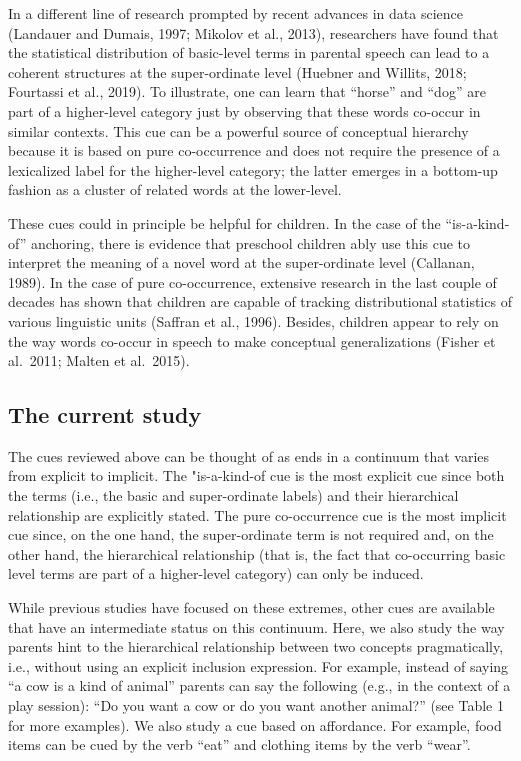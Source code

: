 \documentclass[10pt, letterpaper]{article}
\begin{document}
In a different line of research prompted by recent advances in data
science (Landauer and Dumais, 1997; Mikolov et al., 2013), researchers
have found that the statistical distribution of basic-level terms in
parental speech can lead to a coherent structures at the super-ordinate
level (Huebner and Willits, 2018; Fourtassi et al., 2019). To
illustrate, one can learn that ``horse'' and ``dog'' are part of a
higher-level category just by observing that these words co-occur in
similar contexts. This cue can be a powerful source of conceptual
hierarchy because it is based on pure co-occurrence and does not require
the presence of a lexicalized label for the higher-level category; the
latter emerges in a bottom-up fashion as a cluster of related words at
the lower-level.

These cues could in principle be helpful for children. In the case of
the ``is-a-kind-of'' anchoring, there is evidence that preschool
children ably use this cue to interpret the meaning of a novel word at
the super-ordinate level (Callanan, 1989). In the case of pure
co-occurrence, extensive research in the last couple of decades has
shown that children are capable of tracking distributional statistics of
various linguistic units (Saffran et al., 1996). Besides, children
appear to rely on the way words co-occur in speech to make conceptual
generalizations (Fisher et al.~2011; Malten et al.~2015).

\hypertarget{the-current-study}{%
\subsection{The current study}\label{the-current-study}}

The cues reviewed above can be thought of as ends in a continuum that
varies from explicit to implicit. The "is-a-kind-of cue is the most
explicit cue since both the terms (i.e., the basic and super-ordinate
labels) and their hierarchical relationship are explicitly stated. The
pure co-occurrence cue is the most implicit cue since, on the one hand,
the super-ordinate term is not required and, on the other hand, the
hierarchical relationship (that is, the fact that co-occurring basic
level terms are part of a higher-level category) can only be induced.

While previous studies have focused on these extremes, other cues are
available that have an intermediate status on this continuum. Here, we
also study the way parents hint to the hierarchical relationship between
two concepts pragmatically, i.e., without using an explicit inclusion
expression. For example, instead of saying ``a cow is a kind of animal''
parents can say the following (e.g., in the context of a play session):
``Do you want a cow or do you want another animal?'' (see Table 1 for
more examples). We also study a cue based on affordance. For example,
food items can be cued by the verb ``eat'' and clothing items by the
verb ``wear''.
\end{document}
